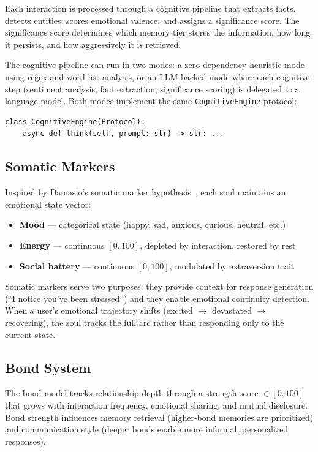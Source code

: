 \documentclass{article}
\begin{document}
Each interaction is processed through a cognitive pipeline that extracts facts, detects entities, scores emotional valence, and assigns a significance score. The significance score determines which memory tier stores the information, how long it persists, and how aggressively it is retrieved.

The cognitive pipeline can run in two modes: a zero-dependency heuristic mode using regex and word-list analysis, or an LLM-backed mode where each cognitive step (sentiment analysis, fact extraction, significance scoring) is delegated to a language model. Both modes implement the same \texttt{CognitiveEngine} protocol:

\begin{verbatim}
class CognitiveEngine(Protocol):
    async def think(self, prompt: str) -> str: ...
\end{verbatim}

\subsection{Somatic Markers}

Inspired by Damasio's somatic marker hypothesis~\cite{damasio1994descartes}, each soul maintains an emotional state vector:

\begin{itemize}[leftmargin=*, topsep=2pt, itemsep=1pt]
  \item \textbf{Mood} --- categorical state (happy, sad, anxious, curious, neutral, etc.)
  \item \textbf{Energy} --- continuous $[0, 100]$, depleted by interaction, restored by rest
  \item \textbf{Social battery} --- continuous $[0, 100]$, modulated by extraversion trait
\end{itemize}

Somatic markers serve two purposes: they provide context for response generation (``I notice you've been stressed'') and they enable emotional continuity detection. When a user's emotional trajectory shifts (excited $\rightarrow$ devastated $\rightarrow$ recovering), the soul tracks the full arc rather than responding only to the current state.

\subsection{Bond System}

The bond model tracks relationship depth through a strength score $\in [0, 100]$ that grows with interaction frequency, emotional sharing, and mutual disclosure. Bond strength influences memory retrieval (higher-bond memories are prioritized) and communication style (deeper bonds enable more informal, personalized responses).
\end{document}
